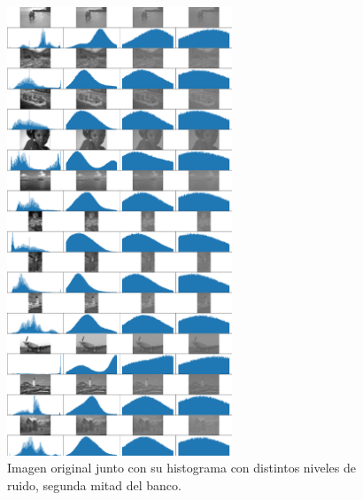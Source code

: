 \begin{figure}
    \centering
    \includegraphics[width=0.6\textwidth]{figuras/img_hist_noise_2.png}
    \caption{Imagen original junto con su histograma con distintos niveles de ruido, segunda mitad del banco.}
\end{figure}


